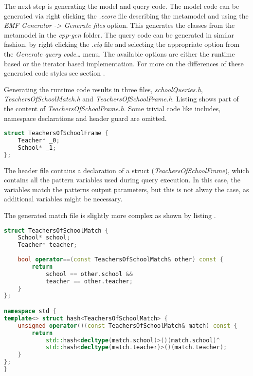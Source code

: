 The next step is generating the model and query code. The model code can be
generated via right clicking the \emph{.ecore} file describing the metamodel
and using the \emph{EMF Generator -> Generate \CPP{} files} option. This generates
the \CPP{} classes from the metamodel in the \emph{cpp-gen} folder. The query
code can be generated in similar fashion, by right clicking the \emph{.eiq} file
and selecting the appropriate option from the \emph{Generate query code\ldots}
menu. The available options are either the runtime based or the iterator based
implementation. For more on the differences of these generated code styles see
section .

Generating the runtime code results in three files, \emph{schoolQueries.h},
\emph{TeachersOfSchoolMatch.h} and \emph{TeachersOfSchoolFrame.h}. Listing
 shows part of the content of \emph{TeachersOfSchoolFrame.h}.
Some trivial code like includes, namespace declarations and header guard are
omitted.

\begin{lstlisting}[frame=single,float=!ht,language=C++,
label=listing:tos_frame, caption=The contents of \emph{TeachersOfSchoolFrame.h}] 
struct TeachersOfSchoolFrame {
	Teacher* _0;
	School* _1;
};
\end{lstlisting}

The header file contains a declaration of a struct
(\emph{TeachersOfSchoolFrame}), which contains all the pattern variables used
during query execution. In this case, the variables match the patterns output
parameters, but this is not alway the case, as additional variables might be
necessary.

The generated match file is slightly more complex as shown by listing
.

\begin{lstlisting}[frame=single,float=!ht,language=C++,
label=listing:tos_match, caption=The contents of \emph{TeachersOfSchoolMatch.h}] 
struct TeachersOfSchoolMatch {	
	School* school;
	Teacher* teacher;
	
	bool operator==(const TeachersOfSchoolMatch& other) const {
		return 
			school == other.school &&
			teacher == other.teacher;
	}	
};

namespace std {
template<> struct hash<TeachersOfSchoolMatch> {
	unsigned operator()(const TeachersOfSchoolMatch& match) const {
		return 
			std::hash<decltype(match.school)>()(match.school)^
			std::hash<decltype(match.teacher)>()(match.teacher);
	}
};		
}
\end{lstlisting}

